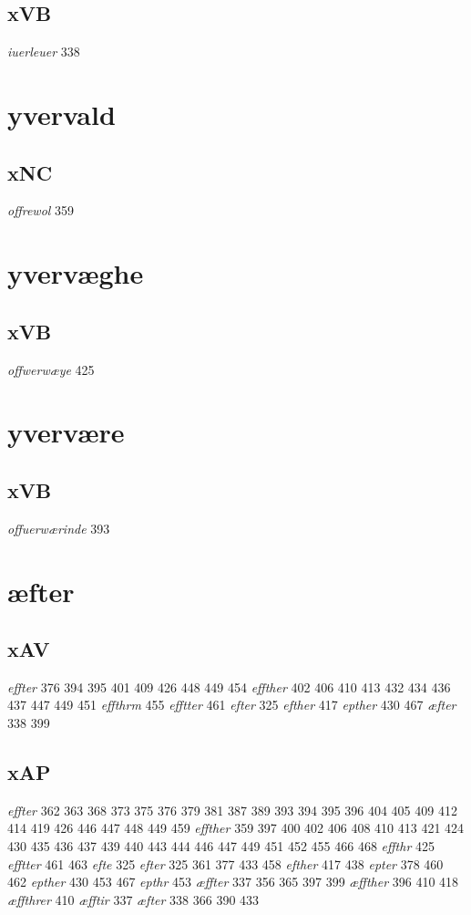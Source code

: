 \documentclass[a4paper,twocolumn]{article}
\begin{document}
\subsection{xVB}
\label{sec:org73a8165}
\emph{iuerleuer} 338 
\section{yvervald}
\label{sec:org1a1a863}
\subsection{xNC}
\label{sec:org5f4c3dc}
\emph{offrewol} 359 
\section{yvervæghe}
\label{sec:orgfc39968}
\subsection{xVB}
\label{sec:org4f3392d}
\emph{offwerwæye} 425 
\section{yvervære}
\label{sec:orgaff3e74}
\subsection{xVB}
\label{sec:org46fa396}
\emph{offuerwærinde} 393 
\section{æfter}
\label{sec:org6244b64}
\subsection{xAV}
\label{sec:org86d6692}
\emph{effter} 376 394 395 401 409 426 448 449 454 \emph{effther} 402 406 410 413 432 434 436 437 447 449 451 \emph{effthrm} 455 \emph{efftter} 461 \emph{efter} 325 \emph{efther} 417 \emph{epther} 430 467 \emph{æfter} 338 399 
\subsection{xAP}
\label{sec:orgfdb6b50}
\emph{effter} 362 363 368 373 375 376 379 381 387 389 393 394 395 396 404 405 409 412 414 419 426 446 447 448 449 459 \emph{effther} 359 397 400 402 406 408 410 413 421 424 430 435 436 437 439 440 443 444 446 447 449 451 452 455 466 468 \emph{effthr} 425 \emph{efftter} 461 463 \emph{efte} 325 \emph{efter} 325 361 377 433 458 \emph{efther} 417 438 \emph{epter} 378 460 462 \emph{epther} 430 453 467 \emph{epthr} 453 \emph{æffter} 337 356 365 397 399 \emph{æffther} 396 410 418 \emph{æffthrer} 410 \emph{æfftir} 337 \emph{æfter} 338 366 390 433 
\end{document}
